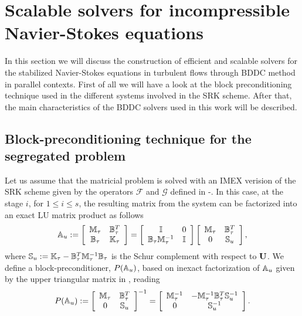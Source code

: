\section{Scalable solvers for incompressible Navier-Stokes equations}
\label{sec-C7_solver}
In this section we will discuss the construction of efficient and scalable solvers for the stabilized Navier-Stokes equations in turbulent flows through BDDC method in parallel contexts. First of all we will have a look at the block preconditioning technique used in the different systems involved in the SRK scheme. After that, the main characteristics of the BDDC solvers used in this work will be described.

\subsection{Block-preconditioning technique for the segregated problem}
\label{subsec-C7_block_prec}
Let us assume that the matricial problem  is solved with an IMEX verision of the SRK scheme given by the operators $ \mathcal{F} $ and $ \mathcal{G} $ defined in -. In this case, at the stage $ i $, for $ 1\le i \le s $, the resulting matrix from the system  can be factorized into an exact LU matrix product as follows
\begin{equation}
\label{eq-C7_SRK_u_mat}
\mathbb{A}_u:=\left[\begin{array}{cc}
\mathbb{M}_\tau&\mathbb{B}_\tau^T\\
\mathbb{B}_\tau&\mathbb{K}_\tau
\end{array}\right]=\left[\begin{array}{cc}
\mathbb{I}&0\\
\mathbb{B}_\tau\mathbb{M}_\tau^{-1}&\mathbb{I}
\end{array}\right]\left[\begin{array}{cc}
\mathbb{M}_\tau&\mathbb{B}_\tau^T\\
0&\mathbb{S}_u
\end{array}\right],
\end{equation}
where $ \mathbb{S}_u:=\mathbb{K}_\tau-\mathbb{B}_\tau^T\mathbb{M}_\tau^{-1}\mathbb{B}_\tau$ is the Schur complement with respect to ${\bf U}$. We define a block-preconditioner, $ P(\mathbb{A}_u) $, based on inexact factorization of $ \mathbb{A}_u $ given by the upper triangular matrix in , reading
\begin{equation}
\label{eq-C7_SRK_u_prec}
P(\mathbb{A}_u):=\left[\begin{array}{cc}
\mathbb{M}_\tau&\mathbb{B}_\tau^T\\
0&\mathbb{S}_u
\end{array}\right]^{-1}=\left[\begin{array}{cc}
\mathbb{M}_\tau^{-1}&-\mathbb{M}_\tau^{-1}\mathbb{B}_\tau^T\mathbb{S}_u^{-1}\\
0&\mathbb{S}_u^{-1}
\end{array}\right].
\end{equation}

